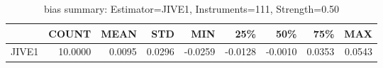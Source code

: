 \begin{table}[ht]
\centering
\caption{bias summary: Estimator=JIVE1, Instruments=111, Strength=0.50}
\begin{tabular}{lrrrrrrrr}
\toprule
 & COUNT & MEAN & STD & MIN & 25\% & 50\% & 75\% & MAX \\
\midrule
JIVE1 & 10.0000 & 0.0095 & 0.0296 & -0.0259 & -0.0128 & -0.0010 & 0.0353 & 0.0543 \\
\bottomrule
\end{tabular}
\end{table}
